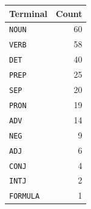 \begin{tabular}{@{}lr@{}}
\toprule
\textbf{Terminal} & \textbf{Count} \\
\midrule
\texttt{NOUN} & 60 \\
\texttt{VERB} & 58 \\
\texttt{DET} & 40 \\
\texttt{PREP} & 25 \\
\texttt{SEP} & 20 \\
\texttt{PRON} & 19 \\
\texttt{ADV} & 14 \\
\texttt{NEG} & 9 \\
\texttt{ADJ} & 6 \\
\texttt{CONJ} & 4 \\
\texttt{INTJ} & 2 \\
\texttt{FORMULA} & 1 \\
\bottomrule
\end{tabular}
